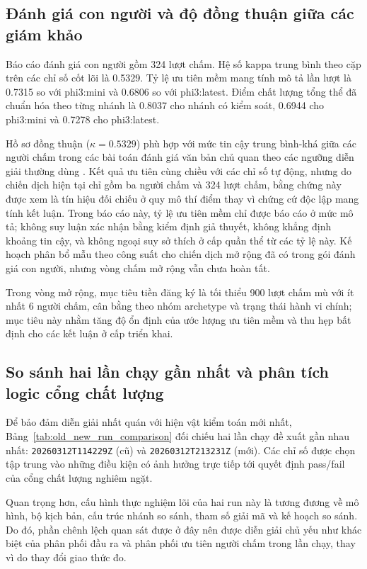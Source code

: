 ﻿\documentclass[a4paper,12pt]{article}
\begin{document}
\subsection{Đánh giá con người và độ đồng thuận giữa các giám khảo}
Báo cáo đánh giá con người gồm 324 lượt chấm. Hệ số kappa trung bình theo cặp trên các chỉ số cốt lõi là 0.5329. Tỷ lệ ưu tiên mềm mang tính mô tả lần lượt là 0.7315 so với phi3:mini và 0.6806 so với phi3:latest. Điểm chất lượng tổng thể đã chuẩn hóa theo từng nhánh là 0.8037 cho nhánh có kiểm soát, 0.6944 cho phi3:mini và 0.7278 cho phi3:latest.

Hồ sơ đồng thuận (\(\kappa=0.5329\)) phù hợp với mức tin cậy trung bình-khá giữa các người chấm trong các bài toán đánh giá văn bản chủ quan theo các ngưỡng diễn giải thường dùng \cite{Landis1977KappaScale}. Kết quả ưu tiên cùng chiều với các chỉ số tự động, nhưng do chiến dịch hiện tại chỉ gồm ba người chấm và 324 lượt chấm, bằng chứng này được xem là tín hiệu đối chiếu ở quy mô thí điểm thay vì chứng cứ độc lập mang tính kết luận. Trong báo cáo này, tỷ lệ ưu tiên mềm chỉ được báo cáo ở mức mô tả; không suy luận xác nhận bằng kiểm định giả thuyết, không khẳng định khoảng tin cậy, và không ngoại suy sở thích ở cấp quần thể từ các tỷ lệ này. Kế hoạch phân bổ mẫu theo công suất cho chiến dịch mở rộng đã có trong gói đánh giá con người, nhưng vòng chấm mở rộng vẫn chưa hoàn tất.

Trong vòng mở rộng, mục tiêu tiền đăng ký là tối thiểu 900 lượt chấm mù với ít nhất 6 người chấm, cân bằng theo nhóm archetype và trạng thái hành vi chính; mục tiêu này nhằm tăng độ ổn định của ước lượng ưu tiên mềm và thu hẹp bất định cho các kết luận ở cấp triển khai.

\subsection{So sánh hai lần chạy gần nhất và phân tích logic cổng chất lượng}
Để bảo đảm diễn giải nhất quán với hiện vật kiểm toán mới nhất, Bảng~\ref{tab:old_new_run_comparison} đối chiếu hai lần chạy đề xuất gần nhau nhất: \texttt{20260312T114229Z} (cũ) và \texttt{20260312T213231Z} (mới). Các chỉ số được chọn tập trung vào những điều kiện có ảnh hưởng trực tiếp tới quyết định pass/fail của cổng chất lượng nghiêm ngặt.

Quan trọng hơn, cấu hình thực nghiệm lõi của hai run này là tương đương về mô hình, bộ kịch bản, cấu trúc nhánh so sánh, tham số giải mã và kế hoạch so sánh. Do đó, phần chênh lệch quan sát được ở đây nên được diễn giải chủ yếu như khác biệt của phân phối đầu ra và phân phối ưu tiên người chấm trong lần chạy, thay vì do thay đổi giao thức đo.
\end{document}
